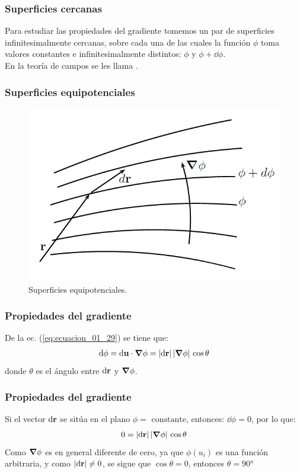 \documentclass[12pt]{beamer}
\begin{document}
\begin{frame}
\frametitle{Superficies cercanas}
Para estudiar las propiedades del gradiente tomemos un par de superficies infinitesimalmente cercanas, sobre cada una de las cuales la función $\phi$ toma valores constantes e infinitesimalmente distintos: $\phi$ y $\phi + \dd{\phi}$.
\\
\bigskip
\pause
En la teoría de campos se les llama .
\end{frame}
\begin{frame}
\frametitle{Superficies equipotenciales}
\begin{figure}[h!]
    \centering
    \includegraphics[scale=0.5]{Imagenes/Superficies_Equipotenciales.png}
    \caption{Superficies equipotenciales.}
    \label{fig:Superficies_Equipotenciales}
\end{figure}
\end{frame}
\begin{frame}
\frametitle{Propiedades del gradiente}
De la ec. (\ref{eq:ecuacion_01_29}) se tiene que:
\pause
\begin{align*}
\dd{\phi} = \dd{\vb{u}} \cdot \grad{\phi} = \abs{\dd{\vb{r}}} \, \abs{\grad{\phi}} \, \cos \theta
\end{align*}
donde $\theta$ es el ángulo entre $\dd{\vb{r}}$ y $\grad{\phi}$.
\end{frame}
\begin{frame}
\frametitle{Propiedades del gradiente}
Si el vector $\dd{\vb{r}}$ se sitúa en el plano $\phi = \text{ constante}$, entonces: $\dd{\phi} = 0$, por lo que:
\pause
\begin{align*}
0 = \abs{\dd{\vb{r}}} \, \abs{\grad{\phi}} \, \cos \theta
\end{align*}
\pause
Como $\grad{\phi}$ es en general diferente de cero, ya que $\phi(u_{i})$ es una función arbitraria, y como $\abs{\dd{\vb{r}}} \neq 0$, se sigue que $\cos \theta = 0$, entonces $\theta = \ang{90}$
\end{frame}
\end{document}
